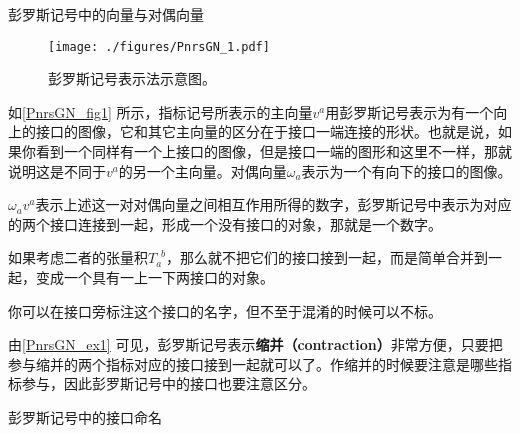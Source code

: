 \begin{example}{彭罗斯记号中的向量与对偶向量}\label{PnrsGN_ex1}


\begin{figure}[ht]
\centering
\texttt{[image: ./figures/PnrsGN\_1.pdf]}
\caption{彭罗斯记号表示法示意图。} \label{PnrsGN_fig1}
\end{figure}


如\autoref{PnrsGN_fig1} 所示，指标记号所表示的主向量$v^a$用彭罗斯记号表示为有一个向上的接口的图像，它和其它主向量的区分在于接口一端连接的形状。也就是说，如果你看到一个同样有一个上接口的图像，但是接口一端的图形和这里不一样，那就说明这是不同于$v^a$的另一个主向量。对偶向量$\omega_a$表示为一个有向下的接口的图像。

$\omega_av^a$表示上述这一对对偶向量之间相互作用所得的数字，彭罗斯记号中表示为对应的两个接口连接到一起，形成一个没有接口的对象，那就是一个数字。

如果考虑二者的张量积$T_a^{\phantom{1}b}$，那么就不把它们的接口接到一起，而是简单合并到一起，变成一个具有一上一下两接口的对象。

你可以在接口旁标注这个接口的名字，但不至于混淆的时候可以不标。

\end{example}


由\autoref{PnrsGN_ex1} 可见，彭罗斯记号表示\textbf{缩并（contraction）}非常方便，只要把参与缩并的两个指标对应的接口接到一起就可以了。作缩并的时候要注意是哪些指标参与，因此彭罗斯记号中的接口也要注意区分。



\begin{example}{彭罗斯记号中的接口命名}



\end{example}


































